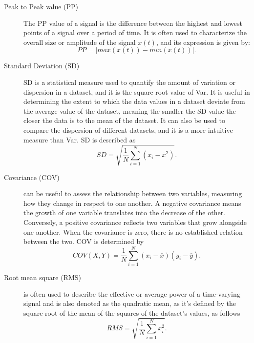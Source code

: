 \begin{description}

    \item[Peak to Peak value (PP)]  
    The \gls{PP} value of a signal is the difference between the highest and lowest points of a signal over a period of time. It is often used to characterize the overall size or amplitude of the signal $x(t)$, and its expression is given by: 
    \begin{equation} \label{eq:pp}
     PP = | max(x(t)) - min (x(t))|.
    \end{equation}
    
    \item[Standard Deviation (SD)] 
    \gls{SD} is a statistical measure used to quantify the amount of variation or dispersion in a dataset, and it is the square root value of \gls{Var}. It is useful in determining the extent to which the data values in a dataset deviate from the average value of the dataset, meaning the smaller the \gls{SD} value the closer the data is to the mean of the dataset. It can also be used to compare the dispersion of different datasets, and it is a more intuitive measure than  \gls{Var}. \gls{SD} is described as
    \begin{equation} \label{eq:stdDeviation}
     SD = \sqrt{ \frac{1}{N} \sum_{i=1}^{N} (x_i - \overline{x}^2)   }.
    \end{equation}

    \item[Covariance (COV)]  
      can be useful to assess the relationship between two variables, measuring how they change in respect to one another. A negative covariance means the growth of one variable translates into the decrease of the other. Conversely, a positive covariance reflects two variables that grow alongside one another. When the covariance is zero, there is no established relation between the two. \gls{COV} is determined by
    \begin{equation} \label{eq:covariance}
     COV (X, Y) = \frac{1}{N} \sum_{i=1}^{N} (x_i - \overline{x}) (y_i - \overline{y}).
    \end{equation}
  
    \item[Root mean square (RMS)]  
      is often used to describe the effective or average power of a time-varying signal and is also denoted as the quadratic mean, as it's defined by the square root of the mean of the squares of the dataset's values, as follows
    \begin{equation} \label{eq:rms}
     RMS = \sqrt{ \frac{1}{N} \sum_{i=1}^{N} x_i^2  }.
    \end{equation}    


\end{description}
